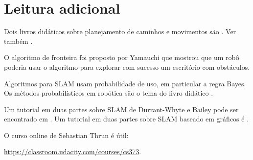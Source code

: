 \section{Leitura adicional}

Dois livros didáticos sobre planejamento de caminhos e movimentos são \cite{latombe,lavalle}. Ver também \cite[Capítulo 6]{siegwart}.

O algoritmo de fronteira foi proposto por Yamauchi \cite{yamauchi} que mostrou que um robô poderia usar o algoritmo para explorar com sucesso um escritório com obstáculos.

Algoritmos para SLAM usam probabilidade de uso, em particular a regra Bayes. Os métodos probabilísticos em robótica são o tema do livro didático \cite{thrun}.

Um tutorial em duas partes sobre SLAM de Durrant-Whyte e Bailey pode ser encontrado em \cite{slam-tutorial1,slam-tutorial2}. Um tutorial em duas partes sobre SLAM baseado em gráficos é \cite{slam-graph}.

O curso online de Sebastian Thrun é útil: \par\url{https://classroom.udacity.com/courses/cs373}.

